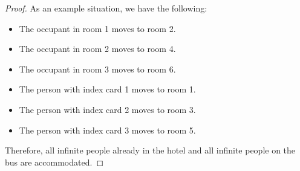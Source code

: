 \documentclass{article}
\begin{document}
\begin{enumerate}
\begin{proof}
    As an example situation, we have the following:
    \begin{itemize}
        \item The occupant in room 1 moves to room 2.
        \item The occupant in room 2 moves to room 4.
        \item The occupant in room 3 moves to room 6.
        \item The person with index card 1 moves to room 1.
        \item The person with index card 2 moves to room 3.
        \item The person with index card 3 moves to room 5.
    \end{itemize}
    Therefore, all infinite people already in the hotel and all infinite people on the bus are accommodated.
\end{proof}

\end{enumerate}
\end{document}
